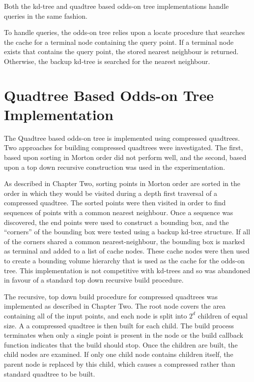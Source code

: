 \documentclass[mcs]{scsthesis}
\begin{document}
Both the kd-tree and quadtree based odds-on tree implementations handle queries
in the same fashion.

To handle queries, the odds-on tree relies upon a locate procedure that searches
the cache for a terminal node containing the query point. If a terminal node
exists that contains the query point, the stored nearest neighbour is returned.
Otherwise, the backup kd-tree is searched for the nearest neighbour.

\section{Quadtree Based Odds-on Tree Implementation}

The Quadtree based odds-on tree is implemented using compressed quadtrees. Two
approaches for building compressed quadtrees were investigated. The first,
based upon sorting in Morton order did not perform well, and the second, based
upon a top down recursive construction was used in the experimentation.

As described in Chapter Two, sorting points in Morton order are sorted in the
order in which they would be visited during a depth first traversal of a
compressed quadtree. The sorted points were then visited in order to find
sequences of points with a common nearest neighbour. Once a sequence was
discovered, the end points were used to construct a bounding box, and the
``corners'' of the bounding box were tested using a backup kd-tree structure.
If all of the corners shared a common nearest-neighbour, the bounding box is
marked as terminal and added to a list of cache nodes. These cache nodes were
then used to create a bounding volume hierarchy that is used as the cache for
the odds-on tree. This implementation is not competitive with kd-trees and so
was abandoned in favour of a standard top down recursive build procedure.

The recursive, top down build procedure for compressed quadtrees was implemented
as described in Chapter Two. The root node covers the area containing all of the
input points, and each node is split into \(2^d\) children of equal size. A 
a compressed quadtree is then built for each child. The build process terminates
when only a single point is present in the node or the build callback function
indicates that the build should stop. Once the children are built, the child
nodes are examined. If only one child node contains children itself, the parent
node is replaced by this child, which causes a compressed rather than standard
quadtree to be built.
\end{document}
